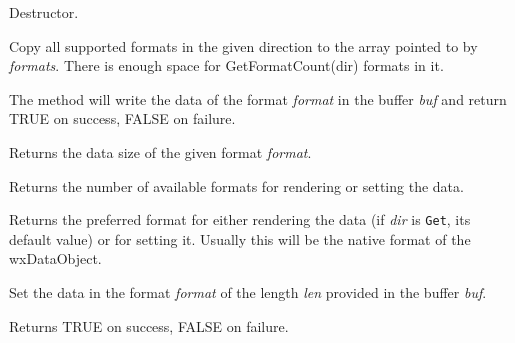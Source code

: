 
Destructor.

\label{wxdataobjectgetallformats}


Copy all supported formats in the given direction to the array pointed to by 
{\it formats}. There is enough space for GetFormatCount(dir) formats in it.


\label{wxdataobjectgetdatahere}


The method will write the data of the format {\it format} in the buffer {\it
buf} and return TRUE on success, FALSE on failure.

\label{wxdataobjectgetdatasize}


Returns the data size of the given format {\it format}.

\label{wxdataobjectgetformatcount}


Returns the number of available formats for rendering or setting the data.

\label{wxdataobjectgetpreferredformat}


Returns the preferred format for either rendering the data (if {\it dir} is {\tt Get},
its default value) or for setting it. Usually this will be the
native format of the wxDataObject.

\label{wxdataobjectsetdata}


Set the data in the format {\it format} of the length {\it len} provided in the
buffer {\it buf}.

Returns TRUE on success, FALSE on failure.

